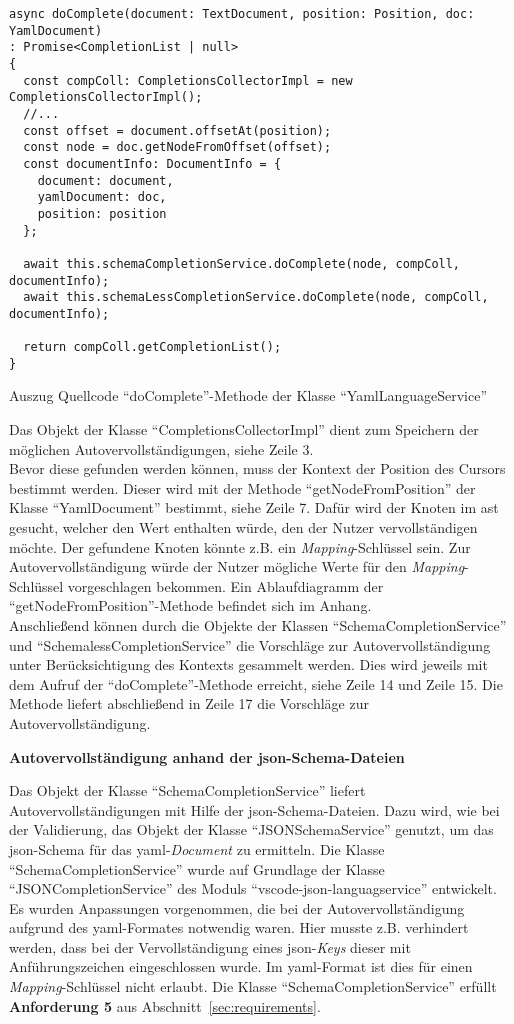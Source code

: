 \begin{listing}[htp]
  \begin{verbatim}
async doComplete(document: TextDocument, position: Position, doc: YamlDocument)
: Promise<CompletionList | null> 
{
  const compColl: CompletionsCollectorImpl = new CompletionsCollectorImpl();
  //...
  const offset = document.offsetAt(position);
  const node = doc.getNodeFromOffset(offset);
  const documentInfo: DocumentInfo = {
    document: document,
    yamlDocument: doc,
    position: position
  };

  await this.schemaCompletionService.doComplete(node, compColl, documentInfo);
  await this.schemaLessCompletionService.doComplete(node, compColl, documentInfo);

  return compColl.getCompletionList();
}
      \end{verbatim}
  \caption{Auszug Quellcode ``doComplete''-Methode der Klasse ``YamlLanguageService''}
  \label{lst:do-complete-yaml-language-service}
\end{listing}

Das Objekt der Klasse ``CompletionsCollectorImpl'' dient zum Speichern der möglichen Autovervollständigungen, siehe Zeile 3.
\\
Bevor diese gefunden werden können, muss der Kontext der Position des Cursors bestimmt werden.
Dieser wird mit der Methode ``getNodeFromPosition'' der Klasse ``YamlDocument'' bestimmt, siehe Zeile 7.
Dafür wird der Knoten im \ac{ast} gesucht, welcher den Wert enthalten würde, den der Nutzer vervollständigen möchte.
Der gefundene Knoten könnte z.B. ein \textit{Mapping}-Schlüssel sein.
Zur Autovervollständigung würde der Nutzer mögliche Werte für den \textit{Mapping}-Schlüssel vorgeschlagen bekommen.
Ein Ablaufdiagramm der ``getNodeFromPosition''-Methode befindet sich im Anhang.
\\
Anschließend können durch die Objekte der Klassen ``SchemaCompletionService'' und ``SchemalessCompletionService''
die Vorschläge zur Autovervollständigung unter Berücksichtigung des Kontexts gesammelt werden.
Dies wird jeweils mit dem Aufruf der ``doComplete''-Methode erreicht, siehe Zeile 14 und Zeile 15.
Die Methode liefert abschließend in Zeile 17 die Vorschläge zur Autovervollständigung.

\textbf{Autovervollständigung anhand der \ac{json}-Schema-Dateien}

Das Objekt der Klasse ``SchemaCompletionService'' liefert Autovervollständigungen mit Hilfe der \ac{json}-Schema-Dateien.
Dazu wird, wie bei der Validierung, das Objekt der Klasse ``JSONSchemaService'' genutzt, um das \ac{json}-Schema für das \ac{yaml}-\textit{Document}
zu ermitteln. Die Klasse ``SchemaCompletionService'' wurde auf Grundlage der Klasse ``JSONCompletionService'' des Moduls ``vscode-json-languagservice''
entwickelt. Es wurden Anpassungen vorgenommen, die bei der Autovervollständigung aufgrund des \ac{yaml}-Formates notwendig waren.
Hier musste z.B. verhindert werden, dass bei der Vervollständigung eines \ac{json}-\textit{Keys} dieser mit Anführungszeichen eingeschlossen wurde.
Im \ac{yaml}-Format ist dies für einen \textit{Mapping}-Schlüssel nicht erlaubt.
Die Klasse ``SchemaCompletionService'' erfüllt \textbf{Anforderung 5} aus Abschnitt~\ref{sec:requirements}.

